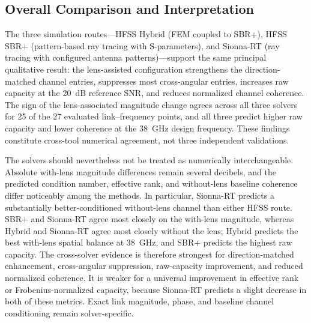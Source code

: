 \subsection{Overall Comparison and Interpretation}
The three simulation routes---HFSS Hybrid (FEM coupled to SBR+), HFSS SBR+ (pattern-based ray tracing with S-parameters), and Sionna-RT (ray tracing with configured antenna patterns)---support the same principal qualitative result: the lens-assisted configuration strengthens the direction-matched channel entries, suppresses most cross-angular entries, increases raw capacity at the 20~dB reference SNR, and reduces normalized channel coherence. The sign of the lens-associated magnitude change agrees across all three solvers for 25 of the 27 evaluated link--frequency points, and all three predict higher raw capacity and lower coherence at the 38~GHz design frequency. These findings constitute cross-tool numerical agreement, not three independent validations.

The solvers should nevertheless not be treated as numerically interchangeable. Absolute with-lens magnitude differences remain several decibels, and the predicted condition number, effective rank, and without-lens baseline coherence differ noticeably among the methods. In particular, Sionna-RT predicts a substantially better-conditioned without-lens channel than either HFSS route. SBR+ and Sionna-RT agree most closely on the with-lens magnitude, whereas Hybrid and Sionna-RT agree most closely without the lens; Hybrid predicts the best with-lens spatial balance at 38~GHz, and SBR+ predicts the highest raw capacity. The cross-solver evidence is therefore strongest for direction-matched enhancement, cross-angular suppression, raw-capacity improvement, and reduced normalized coherence. It is weaker for a universal improvement in effective rank or Frobenius-normalized capacity, because Sionna-RT predicts a slight decrease in both of these metrics. Exact link magnitude, phase, and baseline channel conditioning remain solver-specific.

